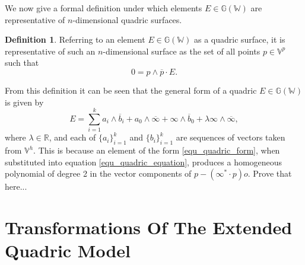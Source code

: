 \documentclass{birkjour}
\theoremstyle{definition}
\newtheorem{defn}[thm]{Definition}
\theoremstyle{remark}
\numberwithin{equation}{section}
\newcommand{\G}{\mathbb{G}}
\newcommand{\V}{\mathbb{V}}
\newcommand{\W}{\mathbb{W}}
\newcommand{\R}{\mathbb{R}}
\newcommand{\nvao}{o}
\newcommand{\nvai}{\infty}
\newcommand{\nvaib}{\overline{\infty}}
\begin{document}
We now give a formal definition under which elements $E\in\G(\W)$
are representative of $n$-dimensional quadric surfaces.
\begin{defn}\label{def_quadric}
Referring to an element $E\in\G(\W)$ as a quadric surface, it is representative of such an $n$-dimensional
surface as the set of all points $p\in\V^p$ such that
\begin{equation}\label{equ_quadric_equation}
0 = p\wedge\overline{p}\cdot E.
\end{equation}
\end{defn}
From this definition it can be seen that the general form of a quadric $E\in\G(\W)$ is given by
\begin{equation}\label{equ_quadric_form}
E = \sum_{i=1}^k a_i\wedge\overline{b}_i + a_0\wedge\nvaib + \nvai\wedge\overline{b}_0 + \lambda\nvai\wedge\nvaib,
\end{equation}
where $\lambda\in\R$, and each of $\{a_i\}_{i=1}^k$ and $\{b_i\}_{i=1}^k$ are sequences of vectors
taken from $\V^h$.  This is because an element of the form \eqref{equ_quadric_form}, when
substituted into equation \eqref{equ_quadric_equation}, produces a homogeneous polynomial
of degree 2 in the vector components of $p-(\nvai^*\cdot p)\nvao$.
Prove that here...

\section{Transformations Of The Extended Quadric Model}
\end{document}
